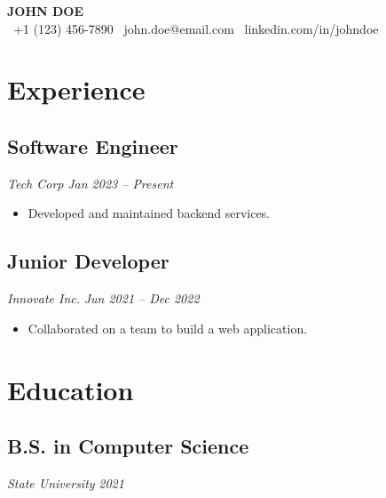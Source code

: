 \documentclass[10pt, a4paper]{article}
\begin{document}
\begin{center}
    \textbf{\Large JOHN DOE} \\
    \vspace{2pt}
    \small
    \faPhone\ +1 (123) 456-7890 \quad \faEnvelope\ john.doe@email.com \quad \faLinkedin\ linkedin.com/in/johndoe
\end{center}

\vspace{10pt}

\section{Experience}

    \subsection{Software Engineer}
    \small\textit{Tech Corp} \hfill \textit{Jan 2023 -- Present}
    \vspace{2pt}
    \begin{itemize}[leftmargin=*,noitemsep,nolistsep]
        \item Developed and maintained backend services.
    \end{itemize}

    \subsection{Junior Developer}
    \small\textit{Innovate Inc.} \hfill \textit{Jun 2021 -- Dec 2022}
    \vspace{2pt}
    \begin{itemize}[leftmargin=*,noitemsep,nolistsep]
        \item Collaborated on a team to build a web application.
    \end{itemize}


\section{Education}

    \subsection{B.S. in Computer Science}
    \small\textit{State University} \hfill \textit{2021}


\vspace{10pt}
\end{document}
